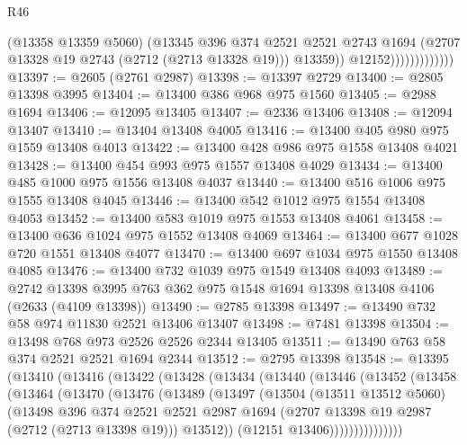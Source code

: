 \begin{lexlean}{R46}
\begin{coremodule}
                                (@13358 @13359 @5060)
                                (@13345
                                  @396
                                  @374
                                  @2521
                                  @2521
                                  @2743
                                  @1694
                                  (@2707 @13328 @19 @2743 (@2712 (@2713 @13328 @19)))
                                  @13359))
                              @12152)))))))))))))
@13397 := @2605 (@2761 @2987)
@13398 := @13397 @2729
@13400 := @2805 @13398 @3995
@13404 := @13400 @386 @968 @975 @1560
@13405 := @2988 @1694
@13406 := @12095 @13405
@13407 := @2336 @13406
@13408 := @12094 @13407
@13410 := @13404 @13408 @4005
@13416 := @13400 @405 @980 @975 @1559 @13408 @4013
@13422 := @13400 @428 @986 @975 @1558 @13408 @4021
@13428 := @13400 @454 @993 @975 @1557 @13408 @4029
@13434 := @13400 @485 @1000 @975 @1556 @13408 @4037
@13440 := @13400 @516 @1006 @975 @1555 @13408 @4045
@13446 := @13400 @542 @1012 @975 @1554 @13408 @4053
@13452 := @13400 @583 @1019 @975 @1553 @13408 @4061
@13458 := @13400 @636 @1024 @975 @1552 @13408 @4069
@13464 := @13400 @677 @1028 @720 @1551 @13408 @4077
@13470 := @13400 @697 @1034 @975 @1550 @13408 @4085
@13476 := @13400 @732 @1039 @975 @1549 @13408 @4093
@13489 := @2742 @13398 @3995 @763 @362 @975 @1548 @1694 @13398 @13408 @4106 (@2633 (@4109 @13398))
@13490 := @2785 @13398
@13497 := @13490 @732 @58 @974 @11830 @2521 @13406 @13407
@13498 := @7481 @13398
@13504 := @13498 @768 @973 @2526 @2526 @2344 @13405
@13511 := @13490 @763 @58 @374 @2521 @2521 @1694 @2344
@13512 := @2795 @13398
@13548 := @13395
    (@13410
      (@13416
        (@13422
          (@13428
            (@13434
              (@13440
                (@13446
                  (@13452
                    (@13458
                      (@13464
                        (@13470
                          (@13476
                            (@13489
                              (@13497
                                (@13504
                                  (@13511 @13512 @5060)
                                  (@13498
                                    @396
                                    @374
                                    @2521
                                    @2521
                                    @2987
                                    @1694
                                    (@2707 @13398 @19 @2987 (@2712 (@2713 @13398 @19)))
                                    @13512))
                                (@12151 @13406)))))))))))))))

\end{coremodule}
\end{lexlean}
